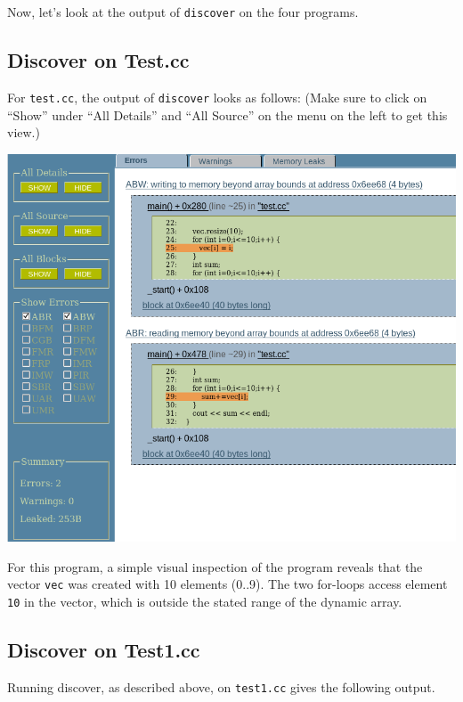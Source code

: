 \documentclass[12pt]{article}
\begin{document}
Now, let's look at the output of \verb+discover+ on the four programs.

\subsection{Discover on Test.cc}
For \verb+test.cc+, the output of \verb+discover+ looks as follows:
(Make sure to click on ``Show'' under ``All Details'' and ``All Source'' on the menu on the left to get this view.)
\begin{center}
\includegraphics[width=6 in]{images/test.png}
\end{center}

For this program, a simple visual inspection of the program reveals that
the vector \verb+vec+ was created with 10 elements (0..9).  The 
two for-loops access element \verb+10+ in the vector, which is outside the stated range of the dynamic array. 

\subsection{Discover on Test1.cc}
Running discover, as described above, on \verb+test1.cc+ 
gives the following output.
 
\end{document}
